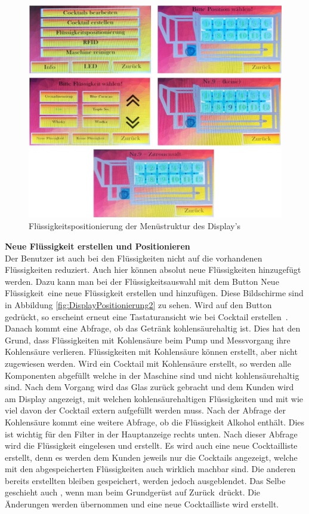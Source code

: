 \begin{figure}[H]
	\centering
	\includegraphics[width=\textwidth]{graphics/DisplayPositionierung1}
	\caption{Flüssigkeitspositionierung der Menüstruktur des Display's}
	\label{fig:DisplayPositionierung1}
\end{figure}

\textbf{Neue Flüssigkeit erstellen und Positionieren}\\
Der Benutzer ist auch bei den Flüssigkeiten nicht auf die vorhandenen Flüssigkeiten reduziert. Auch hier können absolut neue Flüssigkeiten hinzugefügt werden. Dazu kann man bei der Flüssigkeitsauswahl mit dem Button \flqq Neue Flüssigkeit\frqq~eine neue Flüssigkeit erstellen und hinzufügen. Diese Bildschirme sind in Abbildung \ref{fig:DisplayPositionierung2} zu sehen. Wird auf den Button gedrückt, so erscheint erneut eine Tastaturansicht wie bei \flqq Cocktail erstellen\frqq~. Danach kommt eine Abfrage, ob das Getränk kohlensäurehaltig ist. Dies hat den Grund, dass Flüssigkeiten mit Kohlensäure beim Pump und Messvorgang ihre Kohlensäure verlieren. Flüssigkeiten mit Kohlensäure können erstellt, aber nicht zugewiesen werden. Wird ein Cocktail mit Kohlensäure erstellt, so werden alle Komponenten abgefüllt welche in der Maschine sind und nicht kohlensäurehaltig sind. Nach dem Vorgang wird das Glas zurück gebracht und dem Kunden wird am Display angezeigt, mit welchen kohlensäurehaltigen Flüssigkeiten und mit wie viel davon der Cocktail extern aufgefüllt werden muss. Nach der Abfrage der Kohlensäure kommt eine weitere Abfrage, ob die Flüssigkeit Alkohol enthält. Dies ist wichtig für den Filter in der Hauptanzeige rechts unten. Nach dieser Abfrage wird die Flüssigkeit eingelesen und erstellt. Es wird auch eine  neue Cocktailliste erstellt, denn es werden dem Kunden jeweils nur die Cocktails angezeigt, welche mit den abgespeicherten Flüssigkeiten auch wirklich machbar sind. Die anderen bereits erstellten bleiben gespeichert, werden jedoch ausgeblendet. Das Selbe geschieht auch , wenn man beim Grundgerüst auf \flqq Zurück\frqq~drückt. Die Änderungen werden übernommen und eine neue Cocktailliste wird erstellt.

